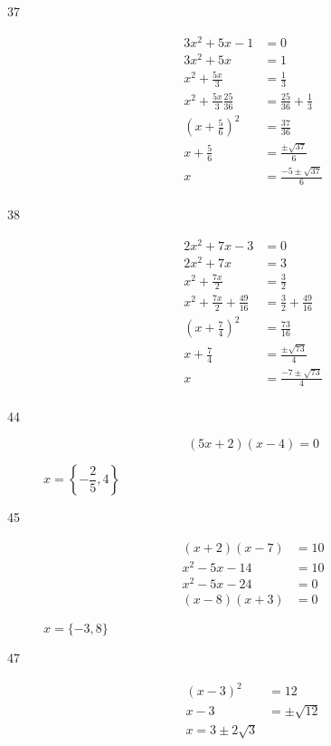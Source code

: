 \documentclass[fleqn,addpoints]{exam}
\begin{document}
\begin{description}
\item[37] 
\begin{align*}
  3x^2 + 5x - 1 &= 0 \\
  3x^2 + 5x &= 1 \\
  x^2 + \frac{5x}{3} &= \frac{1}{3} \\
  x^2 + \frac{5x}{3} \frac{25}{36} &= \frac{25}{36} + \frac{1}{3} \\
  \left( x + \frac{5}{6} \right)^2 &= \frac{37}{36} \\
  x + \frac{5}{6} &= \frac{\pm \sqrt{37}}{6} \\
  x &= \frac{-5 \pm \sqrt{37}}{6} \\
\end{align*}

\item[38] 
\begin{align*}
  2x^2 + 7x - 3 &= 0 \\
  2x^2 + 7x  &= 3 \\
  x^2 + \frac{7x}{2}  &= \frac{3}{2} \\
  x^2 + \frac{7x}{2} + \frac{49}{16} &= \frac{3}{2} + \frac{49}{16}\\
  \left( x + \frac{7}{4} \right)^2 &= \frac{73}{16} \\
  x + \frac{7}{4} &= \frac{\pm \sqrt{73}}{4} \\
  x  &= \frac{-7 \pm \sqrt{73}}{4} \\
\end{align*}

\item[44] 
\[
  (5x+2)(x-4) = 0 
\]

$x = \left \{ - \dfrac{2}{5}, 4 \right \}$

\item[45] 
\begin{align*}
  (x+2)(x-7) &= 10 \\
  x^2 - 5x - 14 &= 10 \\
  x^2 - 5x - 24 &= 0 \\
  (x-8)(x+3) &= 0
\end{align*}

$x = \{-3, 8\}$

\item[47] 
\begin{align*}
  (x-3)^2 &= 12 \\
  x - 3 &= \pm \sqrt{12} \\
  x = 3 \pm 2 \sqrt{3} \\
\end{align*}


\end{description}
\end{document}

